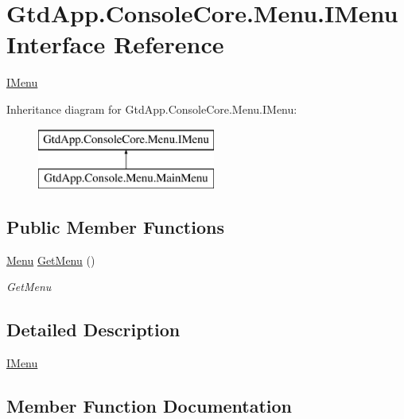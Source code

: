 \hypertarget{interface_gtd_app_1_1_console_core_1_1_menu_1_1_i_menu}{}\section{Gtd\+App.\+Console\+Core.\+Menu.\+I\+Menu Interface Reference}
\label{interface_gtd_app_1_1_console_core_1_1_menu_1_1_i_menu}


\mbox{\hyperlink{interface_gtd_app_1_1_console_core_1_1_menu_1_1_i_menu}{I\+Menu}}  


Inheritance diagram for Gtd\+App.\+Console\+Core.\+Menu.\+I\+Menu\+:\begin{figure}[H]
\begin{center}
\leavevmode
\includegraphics[height=2.000000cm]{interface_gtd_app_1_1_console_core_1_1_menu_1_1_i_menu}
\end{center}
\end{figure}
\subsection*{Public Member Functions}
\begin{DoxyCompactItemize}
\item 
\mbox{\hyperlink{class_gtd_app_1_1_console_core_1_1_menu_1_1_menu}{Menu}} \mbox{\hyperlink{interface_gtd_app_1_1_console_core_1_1_menu_1_1_i_menu_a3a5ae5283f448b4aeb0d4d6404ebebab}{Get\+Menu}} ()
\begin{DoxyCompactList}\small\item\em Get\+Menu \end{DoxyCompactList}\end{DoxyCompactItemize}


\subsection{Detailed Description}
\mbox{\hyperlink{interface_gtd_app_1_1_console_core_1_1_menu_1_1_i_menu}{I\+Menu}} 



\subsection{Member Function Documentation}
\mbox{\label{interface_gtd_app_1_1_console_core_1_1_menu_1_1_i_menu_a3a5ae5283f448b4aeb0d4d6404ebebab}} 
